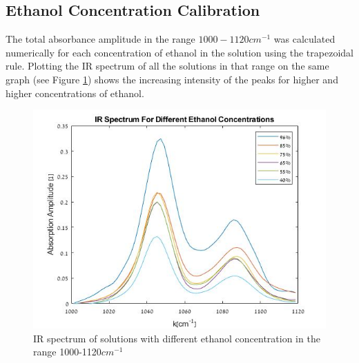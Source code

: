 \documentclass[reprint,amsmath,amssymb,aps, prl,superscriptaddress]{revtex4-2}
\begin{document}
\subsection{Ethanol Concentration Calibration}
The total absorbance amplitude in the range $1000-1120 cm^{-1}$ was calculated numerically
for each concentration of ethanol in the solution using the trapezoidal rule\cite{numerical}.
Plotting the IR spectrum of all the solutions in that range
on the same graph (see Figure \ref{fig:EthanolMixtures})
shows the increasing intensity of the peaks for higher and higher concentrations of ethanol. 
\begin{figure}[H]
    \includegraphics[width=\linewidth]{Images/EthanolAbsorption.jpg}
    \caption{IR spectrum of solutions with different ethanol concentration in the range 1000-1120$cm^{-1}$ }
    \label{fig:EthanolMixtures}
    \centering
\end{figure}
\end{document}
